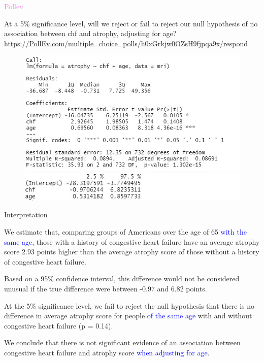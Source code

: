 \documentclass[10pt,t]{beamer}
\begin{document}
\begin{frame}{\textcolor{violet}{Pollev}}
	\vspace{-5 mm}
	
	At a 5\% significance level, will we reject or fail to reject our null hypothesis of no association between chf and atrophy, adjusting for age? {\scriptsize \url{https://PollEv.com/multiple_choice_polls/h0xGrkjw0OZsH9fjpqa9x/respond}}
	
		\begin{figure}
		\includegraphics[scale = 0.53]{figures/mri_multiple_eg1}
		
		\includegraphics[scale = 0.57]{figures/mri_multiple_cis}
	\end{figure}
	
\end{frame}

\begin{frame}{Interpretation}


We estimate that, comparing groups of Americans over the age of 65 \textcolor{blue}{with the same age}, those with a history of congestive heart failure have an average atrophy score 2.93 points higher than the average atrophy score of those without a history of congestive heart failure.

\bigskip

Based on a 95\% confidence interval, this difference would not be considered unusual if the true difference were between -0.97 and 6.82 points. 

\bigskip

At the 5\% significance level, we fail to reject the null hypothesis that there is no difference in average atrophy score for people \textcolor{blue}{of the same age} with and without congestive heart failure (p = 0.14). 

\bigskip

We conclude that there is not significant evidence of an association between congestive heart failure and atrophy score \textcolor{blue}{when adjusting for age}. 

\end{frame}
\end{document}
